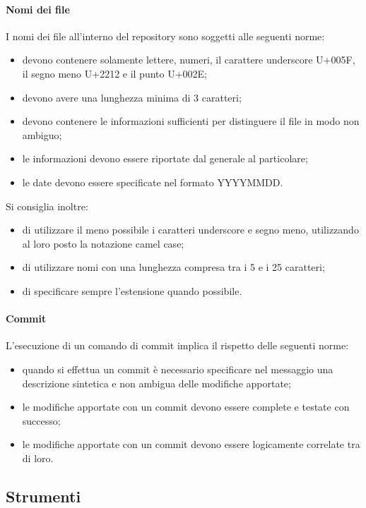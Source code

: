 			\paragraph{Nomi dei file}
				I nomi dei file all’interno del repository sono soggetti alle seguenti norme:
				\begin{itemize}
					\item devono contenere solamente lettere, numeri, il carattere underscore U+005F, il segno meno U+2212 e il punto U+002E;
					\item devono avere una lunghezza minima di 3 caratteri;
					\item devono contenere le informazioni sufficienti per distinguere il file in modo non ambiguo;
					\item le informazioni devono essere riportate dal generale al particolare;
					\item le date devono essere specificate nel formato YYYYMMDD.
				\end{itemize}
				Si consiglia inoltre:
				\begin{itemize}
					\item di utilizzare il meno possibile i caratteri underscore e segno meno, utilizzando al loro posto la notazione camel case;
					\item di utilizzare nomi con una lunghezza compresa tra i 5 e i 25 caratteri;
					\item di specificare sempre l’estensione quando possibile.
				\end{itemize}
			\paragraph{Commit}
				L'esecuzione di un comando di commit implica il rispetto delle seguenti norme:
				\begin{itemize}
					\item quando si effettua un commit è necessario specificare nel messaggio una descrizione sintetica e non ambigua delle modifiche apportate;
					\item le modifiche apportate con un commit devono essere complete e testate con successo;
					\item le modifiche apportate con un commit devono essere logicamente correlate tra di loro.
				\end{itemize}
	\subsection{Strumenti}
		